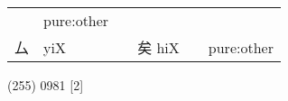 \documentclass[14pt,a4paper]{scrartcl}
\begin{document}
\begin{longtable}[c]{@{}llllll@{}}
\begin{minipage}[t]{0.14\columnwidth}
\strut\end{minipage} &
\begin{minipage}[t]{0.14\columnwidth}\raggedright\strut
pure:other
\strut\end{minipage}\tabularnewline
\begin{minipage}[t]{0.14\columnwidth}\raggedright\strut
厶
\strut\end{minipage} &
\begin{minipage}[t]{0.14\columnwidth}\raggedright\strut
yiX
\strut\end{minipage} &
\begin{minipage}[t]{0.14\columnwidth}\raggedright\strut
\strut\end{minipage} &
\begin{minipage}[t]{0.14\columnwidth}\raggedright\strut
矣 hiX
\strut\end{minipage} &
\begin{minipage}[t]{0.14\columnwidth}\raggedright\strut
\strut\end{minipage} &
\begin{minipage}[t]{0.14\columnwidth}\raggedright\strut
pure:other
\strut\end{minipage}\tabularnewline
\bottomrule
\end{longtable}

(255) 0981 {[}2{]}
\end{document}
